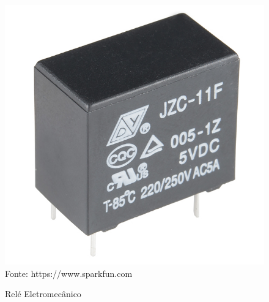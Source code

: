 \begin{figure}[h!]
	\caption{Relé Eletromecânico}
	\centering
	\includegraphics[scale=0.6]{../images/relay.jpg}
	\hspace{\linewidth}
	Fonte: https://www.sparkfun.com
	\label{figura:relay}
\end{figure}
